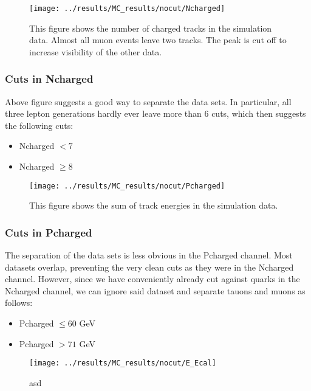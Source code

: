 \newpage
\begin{figure}[h]
\centering
\texttt{[image: ../results/MC\_results/nocut/Ncharged]}
\caption[Ncharged in simulation data]{This figure shows the number of charged tracks in the simulation data. Almost all muon events leave two tracks. The peak is cut off to increase visibility of the other data.}
\label{fig:Ncharged}
\end{figure}

\subsubsection{Cuts in Ncharged}
Above figure suggests a good way to separate the data sets. In particular, all three lepton generations hardly ever leave more than 6 cuts, which then suggests the following cuts:

\begin{itemize}
	\item{ Ncharged $<7$}
	\item{ Ncharged $\ge8$}
\end{itemize}



\newpage
\begin{figure}[h]
\centering
\texttt{[image: ../results/MC\_results/nocut/Pcharged]}
\caption[Pcharged in simulation data]{This figure shows the sum of track energies in the simulation data. }
\label{fig:Pcharged}
\end{figure}

\subsubsection{Cuts in Pcharged}
The separation of the data sets is less obvious in the Pcharged channel. Most datasets overlap, preventing the very clean cuts as they were in the Ncharged channel. However, since we have conveniently already cut against quarks in the Ncharged channel, we can ignore said dataset and separate tauons and muons as follows:
\begin{itemize}
	\item{ Pcharged $\le60$ GeV}
	\item{ Pcharged $>71$ GeV}
\end{itemize}

\newpage
\begin{figure}[h]
\centering
\texttt{[image: ../results/MC\_results/nocut/E\_Ecal]}
\caption[E\_Ecal in simulations]{asd}
\label{fig:E_Ecal}
\end{figure}

